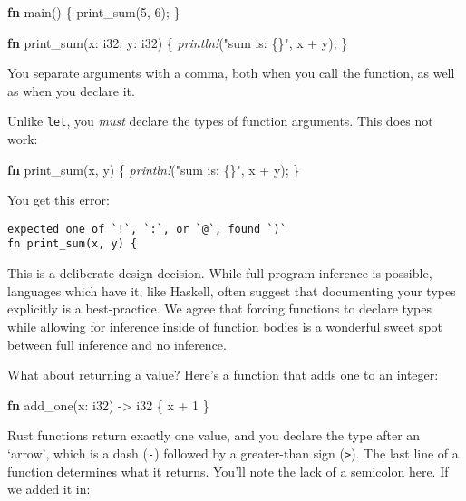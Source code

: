 \documentclass[a4paper,]{book}
\newenvironment{Shaded}{\begin{snugshade}}{\end{snugshade}}
\newcommand{\KeywordTok}[1]{\textcolor[rgb]{0.13,0.29,0.53}{\textbf{{#1}}}}
\newcommand{\DataTypeTok}[1]{\textcolor[rgb]{0.13,0.29,0.53}{{#1}}}
\newcommand{\DecValTok}[1]{\textcolor[rgb]{0.00,0.00,0.81}{{#1}}}
\newcommand{\StringTok}[1]{\textcolor[rgb]{0.31,0.60,0.02}{{#1}}}
\newcommand{\PreprocessorTok}[1]{\textcolor[rgb]{0.56,0.35,0.01}{\textit{{#1}}}}
\newcommand{\NormalTok}[1]{{#1}}
\begin{document}
\begin{Shaded}
\begin{Highlighting}[]
\KeywordTok{fn} \NormalTok{main() \{}
    \NormalTok{print_sum(}\DecValTok{5}\NormalTok{, }\DecValTok{6}\NormalTok{);}
\NormalTok{\}}

\KeywordTok{fn} \NormalTok{print_sum(x: }\DataTypeTok{i32}\NormalTok{, y: }\DataTypeTok{i32}\NormalTok{) \{}
    \PreprocessorTok{println!}\NormalTok{(}\StringTok{"sum is: \{\}"}\NormalTok{, x + y);}
\NormalTok{\}}
\end{Highlighting}
\end{Shaded}

You separate arguments with a comma, both when you call the function, as
well as when you declare it.

Unlike \texttt{let}, you \emph{must} declare the types of function
arguments. This does not work:

\begin{Shaded}
\begin{Highlighting}[]
\KeywordTok{fn} \NormalTok{print_sum(x, y) \{}
    \PreprocessorTok{println!}\NormalTok{(}\StringTok{"sum is: \{\}"}\NormalTok{, x + y);}
\NormalTok{\}}
\end{Highlighting}
\end{Shaded}

You get this error:

\begin{verbatim}
expected one of `!`, `:`, or `@`, found `)`
fn print_sum(x, y) {
\end{verbatim}

This is a deliberate design decision. While full-program inference is
possible, languages which have it, like Haskell, often suggest that
documenting your types explicitly is a best-practice. We agree that
forcing functions to declare types while allowing for inference inside
of function bodies is a wonderful sweet spot between full inference and
no inference.

What about returning a value? Here's a function that adds one to an
integer:

\begin{Shaded}
\begin{Highlighting}[]
\KeywordTok{fn} \NormalTok{add_one(x: }\DataTypeTok{i32}\NormalTok{) -> }\DataTypeTok{i32} \NormalTok{\{}
    \NormalTok{x + }\DecValTok{1}
\NormalTok{\}}
\end{Highlighting}
\end{Shaded}

Rust functions return exactly one value, and you declare the type after
an `arrow', which is a dash (\texttt{-}) followed by a greater-than sign
(\texttt{\textgreater{}}). The last line of a function determines what
it returns. You'll note the lack of a semicolon here. If we added it in:
\end{document}
